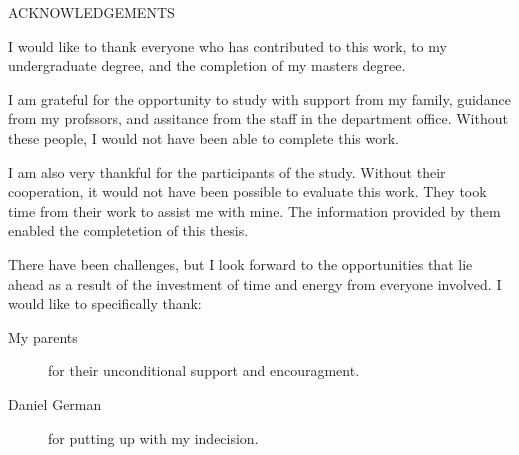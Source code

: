 \newpage
{}

\begin{center}
ACKNOWLEDGEMENTS
\end{center}

I would like to thank everyone who has contributed to this work, to my
undergraduate degree, and the completion of my masters degree.

I am grateful for the opportunity to study with support from my family,
guidance from my profssors, and assitance from the staff in the
department office.
Without these people, I would not have been able to complete this work.

I am also very thankful for the participants of the study.
Without their cooperation, it would not have been possible to evaluate
this work.
They took time from their work to assist me with mine.
The information provided by them enabled the completetion of this
thesis.

There have been challenges, but I look forward to the opportunities that
lie ahead as a result of the investment of time and energy from everyone
involved.
\newline
\newline
\noindent I would like to specifically thank:
\begin{description}
        \item [My parents] for their unconditional support and encouragment.
        \item [Daniel German] for putting up with my indecision.
\end{description}
